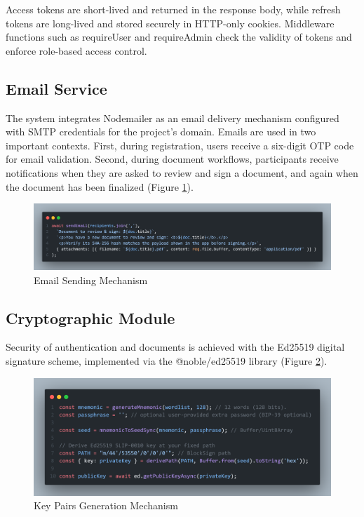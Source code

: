 Access tokens are short-lived and returned in the response body, while refresh tokens are long-lived and stored securely in HTTP-only cookies. Middleware functions such as requireUser and requireAdmin check the validity of tokens and enforce role-based access control.

\subsection{Email Service}
The system integrates Nodemailer as an email delivery mechanism configured with SMTP credentials for the project’s domain. Emails are used in two important contexts. First, during registration, users receive a six-digit OTP code for email validation. Second, during document workflows, participants receive notifications when they are asked to review and sign a document, and again when the document has been finalized (Figure \ref{email-sending}).

\begin{figure}[H]
    \centering
    \includegraphics[width=18cm]{"images/email-sending.png"}
    \caption{Email Sending Mechanism}
    \label{email-sending}
\end{figure}

\subsection{Cryptographic Module}
Security of authentication and documents is achieved with the Ed25519 digital signature scheme, implemented via the @noble/ed25519 library (Figure \ref{keygen}). 

\begin{figure}[H]
    \centering
    \includegraphics[width=18cm]{"images/keygen.png"}
    \caption{Key Pairs Generation Mechanism}
    \label{keygen}
\end{figure}

